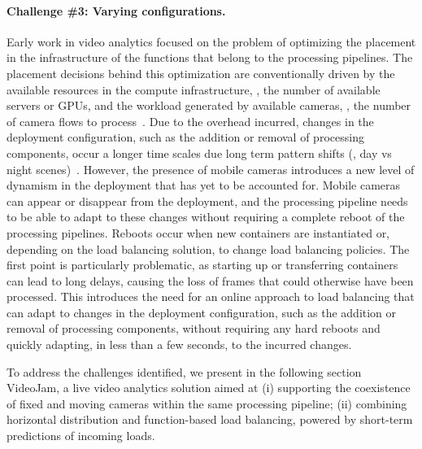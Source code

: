 \paragraph{Challenge \#3: Varying configurations.} Early work in video analytics focused on the problem of optimizing the placement in the infrastructure of the functions that belong to the processing pipelines. The placement decisions behind this optimization are conventionally driven by the available resources in the compute infrastructure, \ie, the number of available servers or GPUs, and the workload generated by available cameras, \ie, the number of camera flows to process~\cite{ao2018sprocket,zhang2017live,fouladi2017encoding}. Due to the overhead incurred, changes in the deployment configuration, such as the addition or removal of processing components, occur a longer time scales due long term pattern shifts (\eg, day vs night scenes)~\cite{jiang2018chameleon,zeng2020distream}. However, the presence of mobile cameras introduces a new level of dynamism in the deployment that has yet to be accounted for. Mobile cameras can appear or disappear from the deployment, and the processing pipeline needs to be able to adapt to these changes without requiring a complete reboot of the processing pipelines. Reboots occur when new containers are instantiated or, depending on the load balancing solution, to change load balancing policies. The first point is particularly problematic, as starting up or transferring containers can lead to long delays, causing the loss of frames that could otherwise have been processed. This introduces the need for an online approach to load balancing that can adapt to changes in the deployment configuration, such as the addition or removal of processing components, without requiring any hard reboots and quickly adapting, in less than a few seconds, to the incurred changes.


To address the challenges identified, we present in the following section VideoJam, a live video analytics solution aimed at (i) supporting the coexistence of fixed and moving cameras within the same processing pipeline; (ii) combining horizontal distribution and function-based load balancing, powered by short-term predictions of incoming loads.